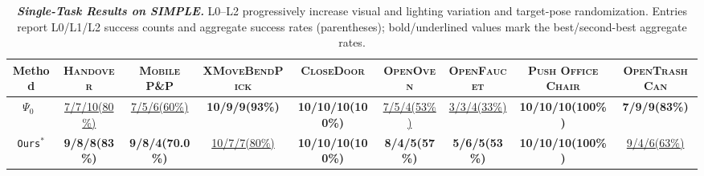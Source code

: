 \begin{table}[H]
  \setlength{\belowcaptionskip}{6pt}
  \caption{\textbf{\textit{Single-Task Results on SIMPLE.}} L0--L2 progressively increase visual and lighting variation and target-pose randomization. Entries report L0/L1/L2 success counts and aggregate success rates (parentheses); bold/underlined values mark the best/second-best aggregate rates.}
  \label{table:simple_main_results}
  \centering
  \setlength{\tabcolsep}{0pt}
  \renewcommand{\arraystretch}{1.08}
  \fontsize{6.2}{7}\selectfont
  \newcommand{\taskheader}[1]{{\fontsize{5.55}{6.2}\selectfont\textbf{\textsc{\hspace{2.2pt}#1\hspace{2.2pt}}}}}
  \newcommand{\resultentry}[2]{{\fontsize{5.2}{6}\selectfont\hspace{2.2pt}#1\;(#2)\hspace{2.2pt}}}
  \newcommand{\bestentry}[2]{{\fontsize{5.2}{6}\selectfont\textbf{\hspace{2.2pt}#1\;(#2)\hspace{2.2pt}}}}
  \newcommand{\secondentry}[2]{{\fontsize{5.2}{6}\selectfont\hspace{2.2pt}\underline{#1\;(#2)}\hspace{2.2pt}}}

  \begin{adjustbox}{width=\textwidth}
  \begin{tabular}{@{}c*{8}{c}@{}}
    \toprule
    {\fontsize{5.55}{6.2}\selectfont\textbf{Method}}
    & \taskheader{Handover}
    & \taskheader{Mobile P\&P}
    & \taskheader{XMoveBendPick}
    & \taskheader{CloseDoor}
    & \taskheader{OpenOven}
    & \taskheader{OpenFaucet}
    & \taskheader{Push Office Chair}
    & \taskheader{OpenTrashCan} \\
    \midrule

    $\Psi_0$~\cite{psi0}
    & \secondentry{7/7/10}{80\%}
    & \secondentry{7/5/6}{60\%}
    & \bestentry{10/9/9}{93\%}
    & \bestentry{10/10/10}{100\%}
    & \secondentry{7/5/4}{53\%}
    & \secondentry{3/3/4}{33\%}
    & \bestentry{10/10/10}{100\%}
    & \bestentry{7/9/9}{83\%} \\

    \rowcolor{hclbrown!15!white}
    \texttt{Ours}$^{*}$
    & \bestentry{9/8/8}{83\%}
    & \bestentry{9/8/4}{70.0\%}
    & \secondentry{10/7/7}{80\%}
    & \bestentry{10/10/10}{100\%}
    & \bestentry{8/4/5}{57\%}
    & \bestentry{5/6/5}{53\%}
    & \bestentry{10/10/10}{100\%}
    & \secondentry{9/4/6}{63\%} \\

    \bottomrule
  \end{tabular}
  \end{adjustbox}
\end{table}
